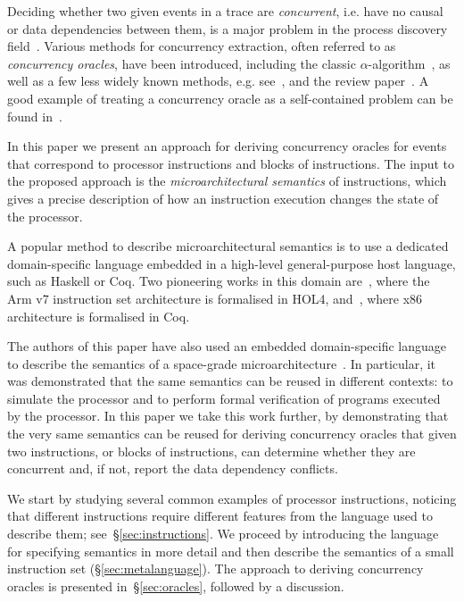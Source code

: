 Deciding whether two given events in a trace are \emph{concurrent}, i.e. have
no causal or data dependencies between them, is a major problem in the process
discovery field~\cite{2011_aalst_book}. Various methods for concurrency
extraction, often referred to as \emph{concurrency oracles}, have been
introduced, including the classic $\alpha$-algorithm~\cite{van2004workflow}, as
well as a few less widely known methods, e.g. see~\cite{cook1998event},
\cite{mokhov2016mining} and the review paper~\cite{augusto2017automated}. A
good example of treating a concurrency oracle as a self-contained problem can
be found in~\cite{dumas2015process}.

In this paper we present an approach for deriving concurrency oracles for
events that correspond to processor instructions and blocks of instructions. The
input to the proposed approach is the \emph{microarchitectural semantics} of
instructions, which gives a precise description of how an instruction execution
changes the state of the processor.

A popular method to describe microarchitectural semantics is to use a dedicated
domain-specific language embedded in a high-level general-purpose host language,
such as Haskell or Coq. Two pioneering works in this domain
are~\cite{fox2010trustworthy}, where the Arm v7 instruction set architecture
is formalised in HOL4, and~\cite{kennedy2013coq}, where x86 architecture is
formalised in Coq.

The authors of this paper have also used an embedded domain-specific language
to describe the semantics of a space-grade
microarchitecture~\cite{mokhov2018formal}. In particular, it was demonstrated
that the same semantics can be reused in different contexts: to simulate the
processor and to perform formal verification of programs executed by the
processor. In this paper we take this work further, by demonstrating that the
very same semantics can be reused for deriving concurrency oracles that given
two instructions, or blocks of instructions, can determine whether they are
concurrent and, if not, report the data dependency conflicts.

We start by studying several common examples of processor instructions, noticing
that different instructions require different features from the language used to
describe them; see~\S\ref{sec:instructions}. We proceed by introducing the
language for specifying semantics in more detail and then describe the semantics
of a small instruction set (\S\ref{sec:metalanguage}). The approach to deriving
concurrency oracles is presented in~\S\ref{sec:oracles}, followed by a
discussion.
